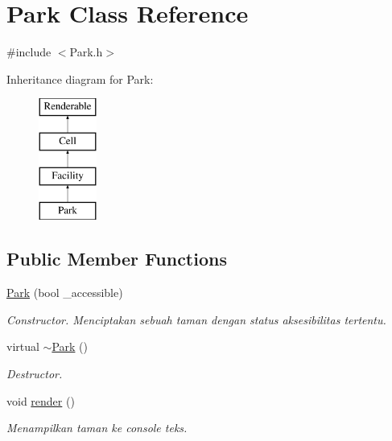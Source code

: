 \hypertarget{classPark}{\section{Park Class Reference}
\label{classPark}
}


{\ttfamily \#include $<$Park.\+h$>$}

Inheritance diagram for Park\+:\begin{figure}[H]
\begin{center}
\leavevmode
\includegraphics[height=4.000000cm]{classPark}
\end{center}
\end{figure}
\subsection*{Public Member Functions}
\begin{DoxyCompactItemize}
\item 
\hyperlink{classPark_aa7122ab2a8e5da8cd1b3c50cdbfdfec2}{Park} (bool \+\_\+accessible)
\begin{DoxyCompactList}\small\item\em Constructor. Menciptakan sebuah taman dengan status aksesibilitas tertentu. \end{DoxyCompactList}\item 
\hypertarget{classPark_aae611d70a5a38a5716cb2358a4a62c7c}{virtual \hyperlink{classPark_aae611d70a5a38a5716cb2358a4a62c7c}{$\sim$\+Park} ()}\label{classPark_aae611d70a5a38a5716cb2358a4a62c7c}

\begin{DoxyCompactList}\small\item\em Destructor. \end{DoxyCompactList}\item 
\hypertarget{classPark_afd7fe6ec511aab1b2451096b54c3addd}{void \hyperlink{classPark_afd7fe6ec511aab1b2451096b54c3addd}{render} ()}\label{classPark_afd7fe6ec511aab1b2451096b54c3addd}

\begin{DoxyCompactList}\small\item\em Menampilkan taman ke console teks. \end{DoxyCompactList}\end{DoxyCompactItemize}
